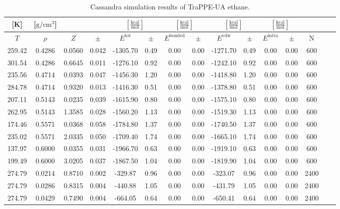\documentclass[%
 aip,
 jcp,
 sd,%
 amsmath,amssymb,
]{revtex4-1}
\begin{document}
\begin{table*}[!htbp]
\centering
\caption{Cassandra simulation results of TraPPE-UA ethane.}
\label{tab:sim-res-TraPPE-ethane}
\begin{ruledtabular}
\begin{tabular}{ccccccccccccccc}
[K] & [$\mathrm{g/cm^3}$] &  &  & \multicolumn{2}{c}{$[\frac{\mathrm{kcal}}{\mathrm{mol}}]$} & \multicolumn{2}{c}{$[\frac{\mathrm{kcal}}{\mathrm{mol}}]$} & \multicolumn{2}{c}{$[\frac{\mathrm{kcal}}{\mathrm{mol}}]$} &\multicolumn{2}{c}{$[\frac{\mathrm{kcal}}{\mathrm{mol}}]$} & \\
\hline
$T$ & $\rho$ & $Z$ & $\pm$ & $E^{\mathrm{tot}}$ & $\pm$ & $E^{\mathrm{bonded}}$ & $\pm$ & $E^{\mathrm{vdw}}$ & $\pm$ & $E^{\mathrm{intra}}$ & $\pm$ & N\\
\hline
259.42	&	0.4286	&	0.0560	&	0.042	&	-1305.70	&	0.49	&	0.00	&	0.00	&	-1271.70	&	0.49	&	0.00	&	0.00	&	600	\\
301.54	&	0.4286	&	0.6645	&	0.011	&	-1276.10	&	0.92	&	0.00	&	0.00	&	-1242.10	&	0.92	&	0.00	&	0.00	&	600	\\
235.56	&	0.4714	&	0.0393	&	0.047	&	-1456.30	&	1.20	&	0.00	&	0.00	&	-1418.80	&	1.20	&	0.00	&	0.00	&	600	\\
284.78	&	0.4714	&	0.9320	&	0.013	&	-1416.30	&	0.51	&	0.00	&	0.00	&	-1378.80	&	0.51	&	0.00	&	0.00	&	600	\\
207.11	&	0.5143	&	0.0235	&	0.039	&	-1615.90	&	0.80	&	0.00	&	0.00	&	-1575.10	&	0.80	&	0.00	&	0.00	&	600	\\
262.95	&	0.5143	&	1.3585	&	0.028	&	-1560.20	&	1.13	&	0.00	&	0.00	&	-1519.30	&	1.13	&	0.00	&	0.00	&	600	\\
174.46	&	0.5571	&	0.0368	&	0.058	&	-1784.80	&	1.37	&	0.00	&	0.00	&	-1740.50	&	1.37	&	0.00	&	0.00	&	600	\\
235.02	&	0.5571	&	2.0335	&	0.050	&	-1709.40	&	1.74	&	0.00	&	0.00	&	-1665.10	&	1.74	&	0.00	&	0.00	&	600	\\
137.97	&	0.6000	&	0.0355	&	0.031	&	-1966.70	&	0.63	&	0.00	&	0.00	&	-1919.10	&	0.63	&	0.00	&	0.00	&	600	\\
199.49	&	0.6000	&	3.0205	&	0.037	&	-1867.50	&	1.04	&	0.00	&	0.00	&	-1819.90	&	1.04	&	0.00	&	0.00	&	600	\\
274.79	&	0.0214	&	0.8710	&	0.002	&	-329.87	&	0.96	&	0.00	&	0.00	&	-323.07	&	0.96	&	0.00	&	0.00	&	2400	\\
274.79	&	0.0286	&	0.8315	&	0.004	&	-440.88	&	1.05	&	0.00	&	0.00	&	-431.79	&	1.05	&	0.00	&	0.00	&	2400	\\
274.79	&	0.0429	&	0.7490	&	0.004	&	-664.05	&	0.64	&	0.00	&	0.00	&	-650.41	&	0.64	&	0.00	&	0.00	&	2400	\\

\end{tabular}
\end{ruledtabular}
\end{table*}
\end{document}
